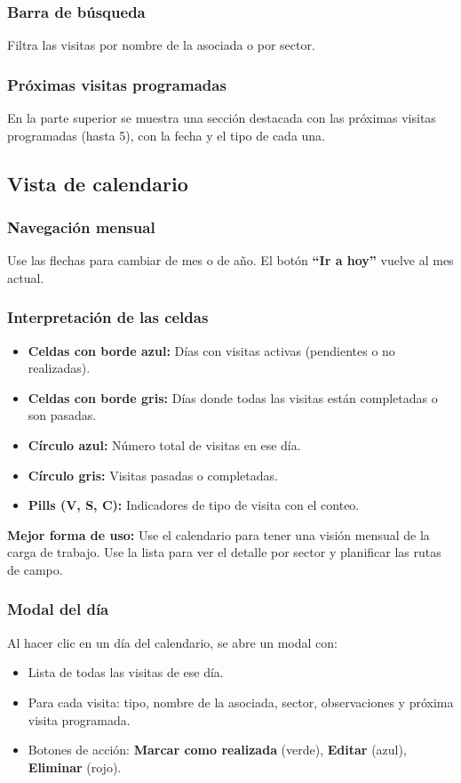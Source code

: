 \documentclass[12pt]{article}
\begin{document}
\subsubsection{Barra de búsqueda}
Filtra las visitas por nombre de la asociada o por sector.

\subsubsection{Próximas visitas programadas}
En la parte superior se muestra una sección destacada con las próximas visitas programadas (hasta 5), con la fecha y el tipo de cada una.

\subsection{Vista de calendario}

\subsubsection{Navegación mensual}
Use las flechas para cambiar de mes o de año. El botón \textbf{``Ir a hoy''} vuelve al mes actual.

\subsubsection{Interpretación de las celdas}
\begin{itemize}[nosep]
  \item \textbf{Celdas con borde azul:} Días con visitas activas (pendientes o no realizadas).
  \item \textbf{Celdas con borde gris:} Días donde todas las visitas están completadas o son pasadas.
  \item \textbf{Círculo azul:} Número total de visitas en ese día.
  \item \textbf{Círculo gris:} Visitas pasadas o completadas.
  \item \textbf{Pills (V, S, C):} Indicadores de tipo de visita con el conteo.
\end{itemize}

\begin{tipbox}
  \textbf{Mejor forma de uso:} Use el calendario para tener una visión mensual de la carga de trabajo. Use la lista para ver el detalle por sector y planificar las rutas de campo.
\end{tipbox}

\subsubsection{Modal del día}
Al hacer clic en un día del calendario, se abre un modal con:
\begin{itemize}[nosep]
  \item Lista de todas las visitas de ese día.
  \item Para cada visita: tipo, nombre de la asociada, sector, observaciones y próxima visita programada.
  \item Botones de acción: \textbf{Marcar como realizada} (verde), \textbf{Editar} (azul), \textbf{Eliminar} (rojo).
\end{itemize}
\end{document}
